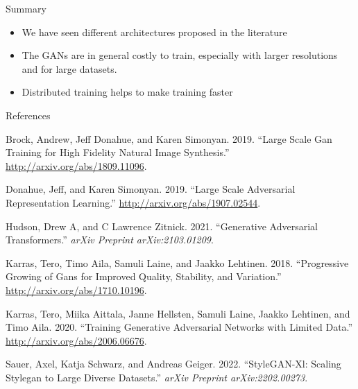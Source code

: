 \begin{frame}{Summary}
\protect\hypertarget{summary}{}

\begin{itemize}
\tightlist
\item
  We have seen different architectures proposed in the literature
\item
  The GANs are in general costly to train, especially with larger
  resolutions and for large datasets.
\item
  Distributed training helps to make training faster
\end{itemize}

\end{frame}

\begin{frame}[allowframebreaks]{References}
\protect\hypertarget{references}{}

\hypertarget{refs}{}
\leavevmode\hypertarget{ref-brock2019large}{}%
Brock, Andrew, Jeff Donahue, and Karen Simonyan. 2019. ``Large Scale Gan
Training for High Fidelity Natural Image Synthesis.''
\url{http://arxiv.org/abs/1809.11096}.

\leavevmode\hypertarget{ref-donahue2019large}{}%
Donahue, Jeff, and Karen Simonyan. 2019. ``Large Scale Adversarial
Representation Learning.'' \url{http://arxiv.org/abs/1907.02544}.

\leavevmode\hypertarget{ref-hudson2021generative}{}%
Hudson, Drew A, and C Lawrence Zitnick. 2021. ``Generative Adversarial
Transformers.'' \emph{arXiv Preprint arXiv:2103.01209}.

\leavevmode\hypertarget{ref-karras2018progressive}{}%
Karras, Tero, Timo Aila, Samuli Laine, and Jaakko Lehtinen. 2018.
``Progressive Growing of Gans for Improved Quality, Stability, and
Variation.'' \url{http://arxiv.org/abs/1710.10196}.

\leavevmode\hypertarget{ref-karras2020training}{}%
Karras, Tero, Miika Aittala, Janne Hellsten, Samuli Laine, Jaakko
Lehtinen, and Timo Aila. 2020. ``Training Generative Adversarial
Networks with Limited Data.'' \url{http://arxiv.org/abs/2006.06676}.

\leavevmode\hypertarget{ref-sauer2022stylegan}{}%
Sauer, Axel, Katja Schwarz, and Andreas Geiger. 2022. ``StyleGAN-Xl:
Scaling Stylegan to Large Diverse Datasets.'' \emph{arXiv Preprint
arXiv:2202.00273}.

\end{frame}
